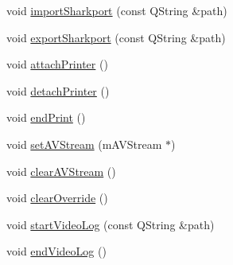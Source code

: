 \begin{DoxyCompactItemize}
void \mbox{\hyperlink{class_q_g_b_a_1_1_core_controller_a9593c570b5f23530f1dedfc9e9a670d6}{import\+Sharkport}} (const Q\+String \&path)
\item 
void \mbox{\hyperlink{class_q_g_b_a_1_1_core_controller_a02397060e26021b7e8bffe715f95accb}{export\+Sharkport}} (const Q\+String \&path)
\item 
void \mbox{\hyperlink{class_q_g_b_a_1_1_core_controller_a0a33c026a8e7338d13e29675269360f8}{attach\+Printer}} ()
\item 
void \mbox{\hyperlink{class_q_g_b_a_1_1_core_controller_a0cafa561225bd09a8629308589130f68}{detach\+Printer}} ()
\item 
void \mbox{\hyperlink{class_q_g_b_a_1_1_core_controller_a387b03d053fb40544d02ac1e58e59c0d}{end\+Print}} ()
\item 
void \mbox{\hyperlink{class_q_g_b_a_1_1_core_controller_a09ce4ac8f3fd85c686423aa45d4f20a3}{set\+A\+V\+Stream}} (m\+A\+V\+Stream $\ast$)
\item 
void \mbox{\hyperlink{class_q_g_b_a_1_1_core_controller_a22d9abcdb21770996c10649bfbc7c3e7}{clear\+A\+V\+Stream}} ()
\item 
void \mbox{\hyperlink{class_q_g_b_a_1_1_core_controller_ad0d1fcb85d6ecb3b24cf048576556604}{clear\+Override}} ()
\item 
void \mbox{\hyperlink{class_q_g_b_a_1_1_core_controller_a204fb37311e61673604ab202b4ff06b5}{start\+Video\+Log}} (const Q\+String \&path)
\item 
void \mbox{\hyperlink{class_q_g_b_a_1_1_core_controller_a71a8499d2b02fc6b86b13cd82080799f}{end\+Video\+Log}} ()
\end{DoxyCompactItemize}
